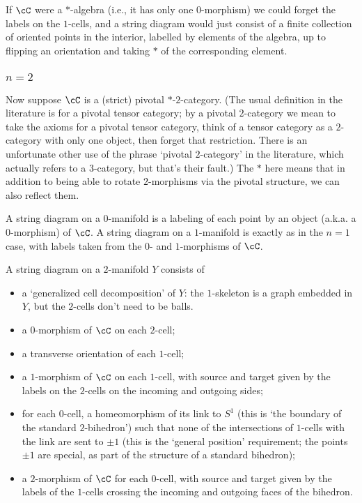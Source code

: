\documentclass[11pt]{amsart}
\theoremstyle{plain}
\begin{document}
If $\cC$ were a $*$-algebra (i.e., it has only one $0$-morphism) we could forget the labels on the $1$-cells, and a string diagram would just consist of a finite collection of oriented points in the interior, labelled by elements of the algebra, up to flipping an orientation and taking $*$ of the corresponding element.

\subsubsection{$n=2$}
Now suppose $\cC$ is a (strict) pivotal $*$-$2$-category. (The usual definition in the literature is for a pivotal tensor category; by a pivotal $2$-category we mean to take the axioms for a pivotal tensor category, think of a tensor category as a $2$-category with only one object, then forget that restriction. There is an unfortunate other use of the phrase `pivotal $2$-category' in the literature, which actually refers to a $3$-category, but that's their fault.) The $*$ here means that in addition to being able to rotate $2$-morphisms via the pivotal structure, we can also reflect them.

A string diagram on a $0$-manifold is a labeling of each point by an object (a.k.a. a $0$-morphism) of $\cC$. A string diagram on a $1$-manifold is exactly as in the $n=1$ case, with labels taken from the $0$- and $1$-morphisms of $\cC$.

A string diagram on a $2$-manifold $Y$ consists of
\begin{itemize}
\item a `generalized cell decomposition' of $Y$: the $1$-skeleton is a graph embedded in $Y$, but the $2$-cells don't need to be balls.
\item a $0$-morphism of $\cC$ on each $2$-cell;
\item a transverse orientation of each $1$-cell;
\item a $1$-morphism of $\cC$ on each $1$-cell, with source and target given by the labels on the $2$-cells on the incoming and outgoing sides;
\item for each $0$-cell, a homeomorphism of its link to $S^1$ (this is `the boundary of the standard $2$-bihedron') such that none of the intersections of $1$-cells with the link are sent to $\pm 1$ (this is the `general position' requirement; the points $\pm 1$ are special, as part of the structure of a standard bihedron);
\item a $2$-morphism of $\cC$ for each $0$-cell, with source and target given by the labels of the $1$-cells crossing the incoming and outgoing faces of the bihedron.
\end{itemize}
\end{document}
